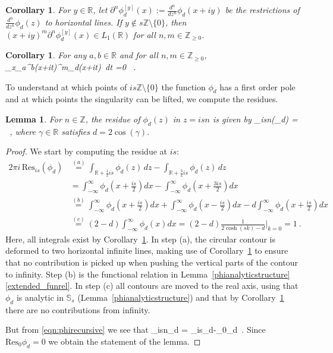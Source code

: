 \documentclass[12pt]{article}
\theoremstyle{plain}
\newtheorem{lemma}[theorem]{Lemma}
\newtheorem{corollary}[theorem]{Corollary}
\theoremstyle{definition}
\numberwithin{equation}{section}
\numberwithin{theorem}{section}
\def\be#1\ee{\begin{equation}#1\end{equation}}
\begin{document}
\begin{corollary} \label{phiL1} For $y\in\mathbb{R}$, let $\partial^n\phi_d^{[y]}(x):=\frac{d^n}{dz^n}\phi_d(x+iy)$ be the restrictions of $\frac{d^n}{dz^n}\phi_d(z)$ to horizontal lines. If $y\notin s\mathbb{Z}\setminus\lbrace 0 \rbrace$, then 
$(x+iy)^m\partial^n\phi_d^{[y]}(x)\in L_1(\mathbb{R})$ 
for all $n,m\in\mathbb{Z}_{\geq 0}$.
\end{corollary}

\begin{corollary} \label{boundaryintegrals} For any $a,b\in\mathbb{R}$ and for all $n,m\in\mathbb{Z}_{\geq 0}$, \be\lim_{x\rightarrow \pm\infty}\int_a^b(x+it)^m\phi_d(x+it)\, dt =0 \ .\ee
\end{corollary}

To understand at which points of $is\mathbb{Z} \setminus \{0\}$ the function $\phi_d$ has a first order pole and at which points the singularity can be lifted, we compute the residues.

\begin{lemma} \label{phiresidue} 
For $n \in \mathbb{Z}$, the residue of $\phi_d(z)$ in $z=isn$  is given by 
\be
\mathrm{Res}_{isn}(\phi_d) =  \ ,
\ee 
where $\gamma \in \mathbb{R}$ satisfies $d=2\cos(\gamma)$.
\end{lemma}

\begin{proof}
We start by computing the residue at $is$:
\begin{align}
2 \pi i \, \mathrm{Res}_{is}(\phi_d) &
\overset{(a)}=\int_{\mathbb{R}+\frac{1}{2}is}\phi_d(z)\,dz - \int_{\mathbb{R}+\frac{3}{2}is}\phi_d(z)\,dz \nonumber\\
&= \int_{-\infty}^{\infty}\phi_d\left(x+\tfrac{is}{2}\right)dx -\int_{-\infty}^{\infty}\phi_d\left(x+\tfrac{3is}{2}\right)dx \nonumber\\
&\overset{(b)}=\int_{-\infty}^{\infty}\phi_d\left(x+\tfrac{is}{2}\right)dx +\int_{-\infty}^{\infty}\phi_d\left(x-\tfrac{is}{2}\right)dx-d\int_{-\infty}^{\infty}\phi_d\left(x+\tfrac{is}{2}\right)dx \nonumber\\
&\overset{(c)}=(2-d)\int_{-\infty}^{\infty}\phi_d(x)dx = (2-d)\frac{1}{2\cosh(sk)-d}\Big|_{k=0}
= 1 \ .
\end{align}
Here, all integrals exist by Corollary~\ref{phiL1}. In step (a), the circular contour is deformed to two horizontal infinite lines, making use of Corollary~\ref{boundaryintegrals} to ensure that no contribution is picked up when pushing the vertical parts of the contour to infinity. Step (b) is the functional relation in
 Lemma~\ref{phianalyticstructure}\,\ref{extended_funrel}. In step (c) all contours are moved to the real axis, using that $\phi_d$ is analytic in $\mathbb{S}_{s}$ (Lemma~\ref{phianalyticstructure}) and that by Corollary~\ref{boundaryintegrals} there are no contributions from infinity.

But from \eqref{eqn:phirecursive} we see that \be\mathrm{Res}_{isn}\phi_d = _{is}\phi_d-_{0}\phi_d\ .\ee
Since $\mathrm{Res}_{0}\phi_d=0$ we obtain the statement of the lemma.
\end{proof}
\end{document}

